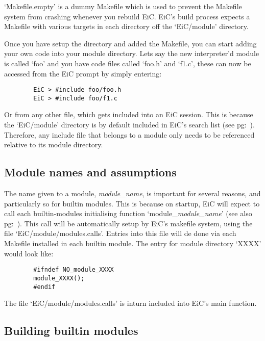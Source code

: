 `Makefile.empty' is a dummy Makefile which is used to prevent the
Makefile system from crashing whenever you rebuild EiC. EiC's build
process expects a Makefile with various targets in each directory off
the `EiC/module' directory.

Once you have setup the directory and added the Makefile, you can
start adding your own code into your module directory. Lets say the
new interpreter'd module is called `foo' and you have code files called
`foo.h' and `f1.c', these can now be accessed from the EiC prompt by
simply entering:

\small
\begin{verbatim}
        EiC > #include foo/foo.h
        EiC > #include foo/f1.c
\end{verbatim}
\normalsize

Or from any other file, which gets included into an EiC session. This
is because the `EiC/module' directory is by default included in EiC's
search list (see pg:~\pageref{item:comm-switch}).  Therefore, any
include file that belongs to a module only needs to be referenced
relative to its module directory.


\subsection{Module names and assumptions}
\label{sec:module_names}

The name given to a module, \textit{module\_name}, is important for
several reasons, and particularly so for builtin modules. This is
because on startup, EiC will expect to call each builtin-modules
initialising function `module\_\textit{module\_name}' (see also
pg:~\pageref{sec:module_initialise}).  This call will be automatically
setup by EiC's makefile system, using the file
`EiC/module/modules.calls'. Entries into this file will de done via
each Makefile installed in each builtin module.  The entry for module
directory `XXXX' would look like:

\small
\begin{verbatim}
        #ifndef NO_module_XXXX
        module_XXXX();
        #endif
\end{verbatim}
\normalsize


The file `EiC/module/modules.calls' is inturn included into 
EiC's main function.


\subsection{Building builtin modules}
\label{sec:builtin_module}

